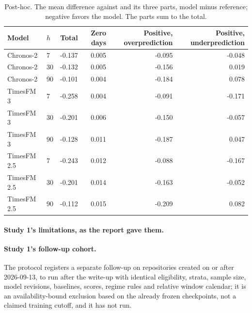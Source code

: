 \begin{table}[htbp]
\centering\small
\caption{Post-hoc. The mean difference against \lm{} and its three parts, model minus reference; negative
favors the model. The parts sum to the total.}
\label{tab:posthoc}
\begin{tabular}{llrrrr}
\toprule
Model & $h$ & Total & Zero days & Positive, overprediction & Positive, underprediction \\
\midrule
Chronos-2 & 7 & -0.137 & 0.005 & -0.095 & -0.048 \\
Chronos-2 & 30 & -0.132 & 0.005 & -0.156 & 0.019 \\
Chronos-2 & 90 & -0.101 & 0.004 & -0.184 & 0.078 \\
TimesFM 3 & 7 & -0.258 & 0.004 & -0.091 & -0.171 \\
TimesFM 3 & 30 & -0.201 & 0.006 & -0.150 & -0.057 \\
TimesFM 3 & 90 & -0.128 & 0.011 & -0.187 & 0.047 \\
TimesFM 2.5 & 7 & -0.243 & 0.012 & -0.088 & -0.167 \\
TimesFM 2.5 & 30 & -0.201 & 0.014 & -0.163 & -0.052 \\
TimesFM 2.5 & 90 & -0.112 & 0.015 & -0.209 & 0.082 \\
\bottomrule
\end{tabular}
\end{table}

\paragraph{Study 1's limitations, as the report gave them.}
\begin{itemize}

\end{itemize}

\paragraph{Study 1's follow-up cohort.} The protocol registers a separate follow-up on repositories created
on or after 2026-09-13, to run after the write-up with identical eligibility, strata, sample size, model
revisions, baselines, scores, regime rules and relative window calendar; it is an availability-bound
exclusion based on the already frozen checkpoints, not a claimed training cutoff, and it has not run.
